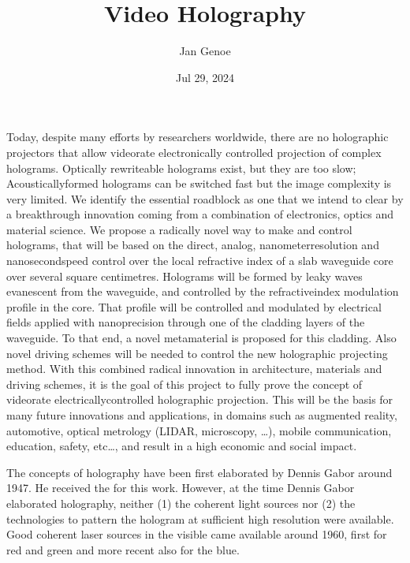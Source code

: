 \documentclass[a4paper,10pt,english,openany,oneside]{jupyterBook}
\title{Video Holography}
\date{Jul 29, 2024}
\author{Jan Genoe}
\begin{document}
\pagestyle{empty}
\sphinxmaketitle
\pagestyle{plain}
\sphinxtableofcontents
\pagestyle{normal}
\label{\detokenize{intro2::doc}}


\begin{DUlineblock}{0em}
\item[] 
\end{DUlineblock}

\sphinxAtStartPar
Today, despite many efforts by researchers world\sphinxhyphen{}wide, there are no holographic projectors that allow video\sphinxhyphen{}rate electronically controlled projection of complex holograms. Optically re\sphinxhyphen{}write\sphinxhyphen{}able holograms exist, but they are too slow; Acoustically\sphinxhyphen{}formed holograms can be switched fast but the image complexity is very limited. We identify the essential roadblock as one that we intend to clear by a breakthrough innovation coming from a combination of electronics, optics and material science.
We propose a radically novel way to make and control holograms, that will be based on the direct, analog, nanometer\sphinxhyphen{}resolution and nanosecond\sphinxhyphen{}speed control over the local refractive index of a slab waveguide core over several square centimetres. Holograms will be formed by leaky waves evanescent from the waveguide, and controlled by the refractive\sphinxhyphen{}index modulation profile in the core. That profile will be controlled and modulated by electrical fields applied with nano\sphinxhyphen{}precision through one of the cladding layers of the waveguide. To that end, a novel metamaterial is proposed for this cladding. Also novel driving schemes will be needed to control the new holographic projecting method.
With this combined radical innovation in architecture, materials and driving schemes, it is the goal of this project to fully prove the concept of video\sphinxhyphen{}rate electrically\sphinxhyphen{}controlled holographic projection. This will be the basis for many future innovations and applications, in domains such as augmented reality, automotive, optical metrology (LIDAR, microscopy, …), mobile communication, education, safety, etc…, and result in a high economic and social impact.

\begin{DUlineblock}{0em}
\item[] 
\end{DUlineblock}

\sphinxAtStartPar
The concepts of holography have been first elaborated by Dennis Gabor around 1947. He received the  for this work. However, at the time Dennis Gabor elaborated holography, neither (1) the coherent light sources nor (2) the technologies to pattern the hologram at sufficient high resolution were available. Good coherent laser sources in the visible came available around 1960, first for red and green and more recent also for the blue.
\end{document}
